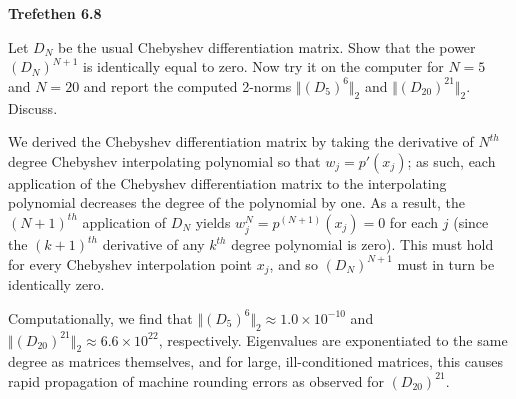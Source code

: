 \textbf{Trefethen 6.8}

Let $D_N$ be the usual Chebyshev differentiation matrix. Show that the power $(D_N)^{N+1}$ is identically equal to zero.
Now try it on the computer for $N = 5$ and $N = 20$ and report the computed 2-norms $\Vert (D_5)^{6} \Vert_2$ and 
$\Vert (D_{20})^{21} \Vert_2$. Discuss.

\begin{solution}
  We derived the Chebyshev differentiation matrix by taking the derivative of $N^{th}$ degree Chebyshev interpolating 
  polynomial so that $w_j = p'(x_j)$; as such, each application of the Chebyshev differentiation matrix to
  the interpolating polynomial decreases the degree of the polynomial by one. As a result, the ${(N+1)}^{th}$ 
  application of $D_N$ yields $w_j^{N} = p^{(N+1)}(x_j) = 0$ for each $j$ (since the ${(k + 1)^{th}}$ derivative of any
  $k^{th}$ degree polynomial is zero). This must hold for every Chebyshev interpolation point $x_j$, and so 
  $(D_N)^{N+1}$ must in turn be identically zero.

  Computationally, we find that $\Vert (D_5)^{6} \Vert_2 \approx 1.0 \times 10^{-10}$ and 
  $\Vert (D_{20})^{21} \Vert_2 \approx 6.6 \times 10^{22}$, respectively. Eigenvalues are exponentiated to the same 
  degree as matrices themselves, and for large, ill-conditioned matrices, this causes rapid propagation of machine 
  rounding errors as observed for $(D_{20})^{21}$.
  \ \\
\end{solution}